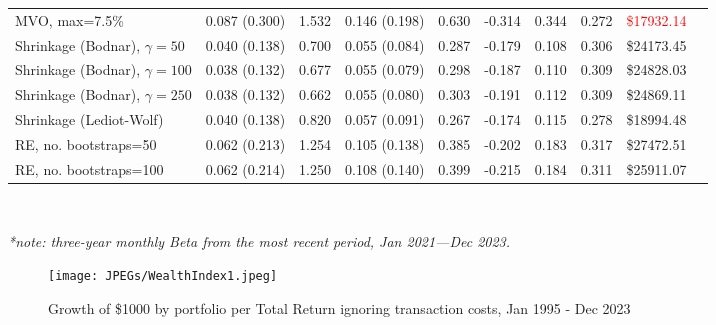\documentclass[12pt,letterpaper]{article}
\begin{document}
\begin{landscape}
\begin{table}[ht]
{\begin{tabular}{lccccccccc}
MVO, max=7.5\% 
& 0.087 (0.300)
& 1.532
& 0.146 (0.198) 
& 0.630 
& -0.314 
& 0.344 
& 0.272 
& \textcolor{red}{\$17932.14} \\


Shrinkage (Bodnar), $\gamma=50$
& 0.040 (0.138)
& 0.700
& 0.055 (0.084) 
& 0.287 
& -0.179 
& 0.108 
& 0.306 
& \textcolor{mygreen}{\$24173.45} \\


Shrinkage (Bodnar), $\gamma=100$
& 0.038 (0.132)
& 0.677
& 0.055 (0.079) 
& 0.298 
& -0.187 
& 0.110 
& 0.309 
& \textcolor{mygreen}{\$24828.03} \\

Shrinkage (Bodnar), $\gamma=250$
& 0.038 (0.132)
& 0.662
& 0.055 (0.080) 
& 0.303 
& -0.191 
& 0.112 
& 0.309 
& \textcolor{mygreen}{\$24869.11} \\

Shrinkage (Lediot-Wolf)
& 0.040 (0.138)
& 0.820
& 0.057 (0.091) 
& 0.267 
& -0.174
& 0.115 
& 0.278
& \textcolor{mygreen}{\$18994.48} \\

RE, no. bootstraps=50
& 0.062 (0.213)
& 1.254
& 0.105 (0.138) 
& 0.385
& -0.202 
& 0.183 
& 0.317 
& \textcolor{mygreen}{\$27472.51} \\

RE, no. bootstraps=100
& 0.062 (0.214)
& 1.250
& 0.108 (0.140) 
& 0.399  
& -0.215 
& 0.184 
& 0.311
& \textcolor{mygreen}{\$25911.07} \\

\bottomrule
\end{tabular}
}
\\{\textit{*note: three-year monthly Beta from the most recent period, Jan 2021---Dec 2023.}\par}
\end{table}
\end{landscape}
\restoregeometry

\begin{figure}
\centering
\texttt{[image: JPEGs/WealthIndex1.jpeg]}
\caption{\label{fig:TotRetWeatlhIndexWithoutTranactionCosts}Growth of \$1000 by portfolio  per Total Return ignoring transaction costs, Jan 1995 - Dec 2023}
\end{figure}
\end{document}
